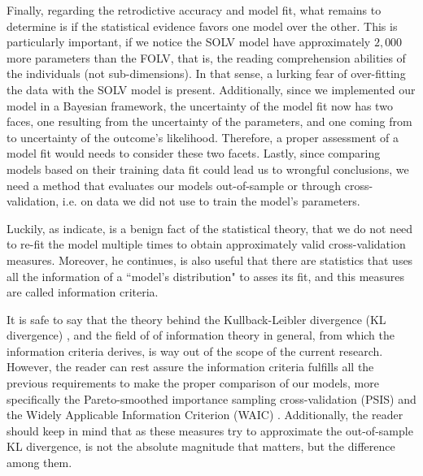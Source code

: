 Finally, regarding the retrodictive accuracy and model fit, what remains to determine is if the statistical evidence favors one model over the other. This is particularly important, if we notice the SOLV model have approximately $2,000$ more parameters than the FOLV, that is, the reading comprehension abilities of the individuals (not sub-dimensions). In that sense, a lurking fear of over-fitting the data with the SOLV model is present. Additionally, since we implemented our model in a Bayesian framework, the uncertainty of the model fit now has two faces, one resulting from the uncertainty of the parameters, and one coming from to uncertainty of the outcome's likelihood. Therefore, a proper assessment of a model fit would needs to consider these two facets. Lastly, since comparing models based on their training data fit could lead us to wrongful conclusions, we need a method that evaluates our models out-of-sample or through cross-validation, i.e. on data we did not use to train the model's parameters.

Luckily, as \citet{McElreath_2020} indicate, is a benign fact of the statistical theory, that we do not need to re-fit the model multiple times to obtain approximately valid cross-validation measures. Moreover, he continues, is also useful that there are statistics that uses all the information of a ``model's distribution" to asses its fit, and this measures are called information criteria.

It is safe to say that the theory behind the Kullback-Leibler divergence (KL divergence) \cite{Kullback_et_al_1951}, and the field of of information theory in general, from which the information criteria derives, is way out of the scope of the current research. However, the reader can rest assure the information criteria fulfills all the previous requirements to make the proper comparison of our models, more specifically the Pareto-smoothed importance sampling cross-validation (PSIS) \cite{vehtari_et_al_2021} and the Widely Applicable Information Criterion (WAIC) \cite{Watanabe_2013}. Additionally, the reader should keep in mind that as these measures try to approximate the out-of-sample KL divergence, is not the absolute magnitude that matters, but the difference among them. 

